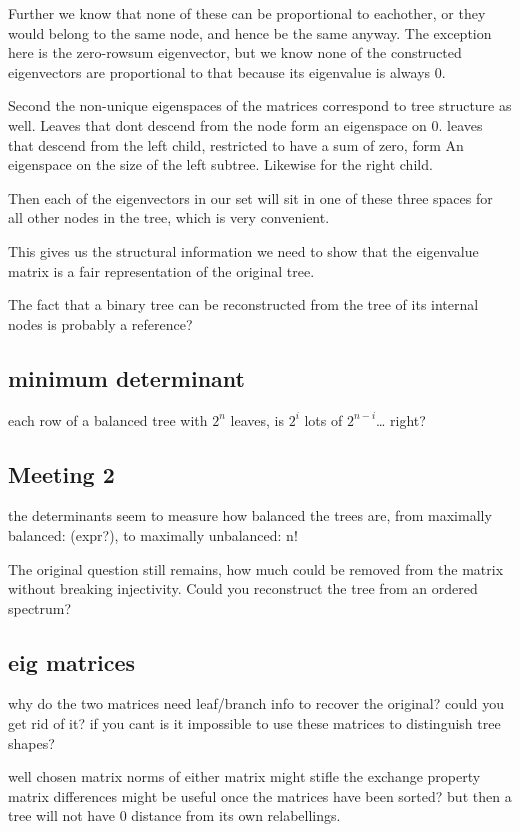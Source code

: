 \documentclass{article}
\begin{document}
Further we know that none of these can be proportional to eachother, or they
would belong to the same node, and hence be the same anyway.
The exception here is the zero-rowsum eigenvector, but we know none of the
constructed eigenvectors are proportional to that because its eigenvalue is
always 0.

Second the non-unique eigenspaces of the matrices correspond to tree structure
as well.
Leaves that dont descend from the node form an eigenspace on 0.
leaves that descend from the left child, restricted to have a sum of zero, form
An eigenspace on the size of the left subtree.
Likewise for the right child.

Then each of the eigenvectors in our set will sit in one of these three spaces
for all other nodes in the tree, which is very convenient.

This gives us the structural information we need to show that the eigenvalue
matrix is a fair representation of the original tree.

The fact that a binary tree can be reconstructed from the tree of its internal
nodes is probably a reference?

\subsection{minimum determinant}

each row of a balanced tree with $2^n$ leaves, is $2^i$ lots of $2^{n-i}$\ldots
right?

\subsection{Meeting 2}

the determinants seem to measure how balanced the trees are, from maximally
balanced: (expr?), to maximally unbalanced: n!

The original question still remains, how much could be removed from the matrix
without breaking injectivity. Could you reconstruct the tree from an ordered
spectrum?

\subsection{eig matrices}

why do the two matrices need leaf/branch info to recover the original? could
you get rid of it? if you cant is it impossible to use these matrices to
distinguish tree shapes?

well chosen matrix norms of either matrix might stifle the exchange property
matrix differences might be useful once the matrices have been sorted? but then
a tree will not have 0 distance from its own relabellings.
\end{document}
